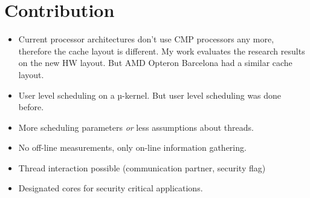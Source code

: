 
\section{Contribution}
\label{state:contr}


\begin{itemize}
  \item Current processor architectures don't use CMP processors any more, therefore
    the cache layout is different. My work evaluates the research results on the
    new HW layout. But AMD Opteron Barcelona had a similar cache layout.
  \item User level scheduling on a $µ$-kernel. But user level scheduling was
    done before.
  \item More scheduling parameters \textit{or} less assumptions about threads.
  \item No off-line measurements, only on-line information gathering.
  \item Thread interaction possible (communication partner, security flag)
  \item Designated cores for security critical applications.
\end{itemize}




